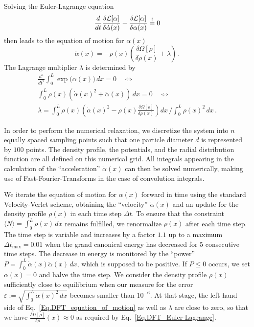\documentclass[aps,pre,twocolumn,superscriptaddress,nofootinbib]{revtex4}
\begin{document}
Solving the Euler-Lagrange equation
%
\begin{equation}
	\frac{d}{dt} \frac{\delta \mathcal{L}[\alpha]}{\delta \dot{\alpha}(x)} - \frac{\delta \mathcal{L}[\alpha]}{\delta \alpha(x)} \overset{!}{=} 0 \\
	\label{Eq.DFT_Euler-Lagrange_dynamical}
\end{equation}
%
then leads to the equation of motion for $\alpha(x)$
%
\begin{equation}
	\ddot{\alpha}(x) = -\rho(x) \left( \frac{\delta \Omega[\rho]}{\delta \rho(x)} + \lambda \right) \, .
	\label{Eq.DFT_equation_of_motion}
\end{equation}
%
The Lagrange multiplier $\lambda$ is determined by
%
\begin{equation}
	\begin{gathered}
		\frac{d^2}{dt^2} \int_{0}^{L} \exp\big( \alpha(x) \big) \, dx = 0 \quad\Leftrightarrow \\
		\int_{0}^{L} \rho(x) \left( \dot{\alpha}(x)^2 + \ddot{\alpha}(x) \right) \, dx = 0 \quad\Leftrightarrow \\
		\lambda = \int_{0}^{L} \rho(x) \left( \dot{\alpha}(x)^2 - \rho(x) \frac{\delta \Omega[\rho]}{\delta \rho(x)} \right) dx \, \bigg/  \int_{0}^{L}  \rho(x)^2 \, dx  \, .
	\end{gathered}
	\label{Eq.DFT_Lagrange_multiplier}
\end{equation}
%

In order to perform the numerical relaxation, we discretize the system into $n$ equally spaced sampling points such that one particle diameter $d$ is represented by $100$ points. 
The density profile, the potentials, and the radial distribution function are all defined on this numerical grid.
All integrals appearing in the calculation of the ``acceleration'' $\ddot{\alpha}(x)$ can then be solved numerically, making use of Fast-Fourier-Transforms in the case of convolution integrals.

We iterate the equation of motion for $\alpha(x)$ forward in time using the standard Velocity-Verlet scheme, obtaining the ``velocity'' $\dot{\alpha}(x)$ and an update for the density profile $\rho(x)$ in each time step $\Delta t$. 
To ensure that the constraint $\langle N \rangle = \int_{0}^{L} \rho(x) \,dx$ remains fulfilled, we renormalize $\rho(x)$ after each time step. 
The time step is variable and increases by a factor $1.1$ up to a maximum $\Delta t_\textrm{max} = 0.01$ when the grand canonical energy has decreased for $5$ consecutive time steps. The decrease in energy is monitored by the ``power'' $P = \int_{0}^{L} \dot{\alpha}(x) \ddot {\alpha}(x) \, dx$, which is supposed to be positive. If $P \leq 0$ occurs, we set $\dot{\alpha}(x) = 0$ and halve the time step. 
We consider the density profile $\rho(x)$ sufficiently close to equilibrium when our measure for the error $\varepsilon := \sqrt{\int_{0}^{L} \ddot{\alpha}(x)^2 \, dx}$ becomes smaller than $10^{-6}$. 
At that stage, the left hand side of Eq.~\eqref{Eq.DFT_equation_of_motion} as well as $\lambda$ are close to zero, so that we have $\frac{\delta \Omega[\rho]}{\delta \rho}(x) \approx 0$ as required by Eq.~\eqref{Eq.DFT_Euler-Lagrange}. 
\end{document}
